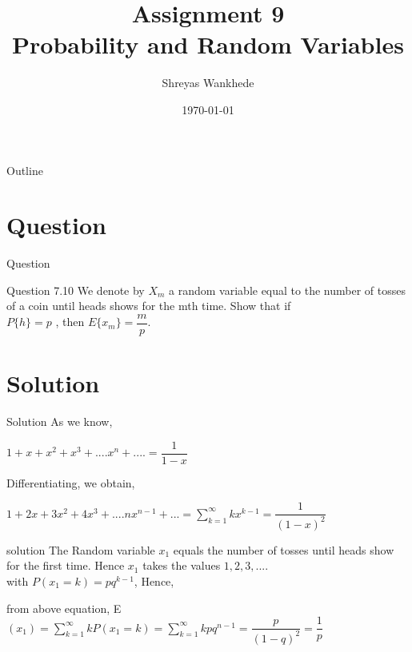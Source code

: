 \documentclass{beamer}
\title{Assignment 9\\Probability and Random Variables}
\author{Shreyas Wankhede}
\date{\today}
\institute{IIT Hyderabad}
\begin{document}
\begin{frame}
    \titlepage 
\end{frame}

\logo{}


\begin{frame}{Outline}
    \tableofcontents
\end{frame}


\section{Question}
\begin{frame}{Question}
\begin{block}{Question 7.10}
We denote by $X_m$ a random variable equal to the number of tosses of a coin until heads shows for the mth time. Show that if\\\vspace{3mm}
 $ P\{h\} = p$ , then $E\{x_m\} = \dfrac{m}{p}. $

\end{block}


\end{frame}


\section{Solution}
\begin{frame}{Solution}
As we know,
    \begin{block}{}
        $1+x+x^2+x^3+....x^n+....=\dfrac{1}{1-x}$
    \end{block}
    Differentiating, we obtain,
    \begin{block}{}
        $1+2x+3x^2+4x^3+....nx^{n-1}+...=\sum_{k=1}^{\infty}kx^{k-1}=\dfrac{1}{(1-x)^2}$
    \end{block}
    
\end{frame} 


\begin{frame}{solution}
The Random variable $x_1$ equals the number of tosses until heads show for the first time. Hence $x_1$ takes the values $1, 2, 3, ....$\\with $P(x_1=k)=pq^{k-1}$, Hence,
\begin{block}{from above equation,}
 E$(x_1)=\sum_{k=1}^{\infty}kP(x_1=k)=\sum_{k=1}^{\infty}kpq^{n-1} =\dfrac{p}{(1-q)^2}=\dfrac{1}{p}$
\end{block}

\end{frame}
\end{document}

